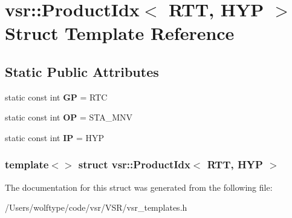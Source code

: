 \hypertarget{structvsr_1_1_product_idx_3_01_r_t_t_00_01_h_y_p_01_4}{\section{vsr\-:\-:Product\-Idx$<$ R\-T\-T, H\-Y\-P $>$ Struct Template Reference}
\label{structvsr_1_1_product_idx_3_01_r_t_t_00_01_h_y_p_01_4}
}
\subsection*{Static Public Attributes}
\begin{DoxyCompactItemize}
\item 
\hypertarget{structvsr_1_1_product_idx_3_01_r_t_t_00_01_h_y_p_01_4_aadbefc9de473b1d8f1e56f3e94e6aa9e}{static const int {\bfseries G\-P} = R\-T\-C}\label{structvsr_1_1_product_idx_3_01_r_t_t_00_01_h_y_p_01_4_aadbefc9de473b1d8f1e56f3e94e6aa9e}

\item 
\hypertarget{structvsr_1_1_product_idx_3_01_r_t_t_00_01_h_y_p_01_4_a3ebb3be1d540a99f85ecdbf57dceb4c9}{static const int {\bfseries O\-P} = S\-T\-A\-\_\-\-M\-N\-V}\label{structvsr_1_1_product_idx_3_01_r_t_t_00_01_h_y_p_01_4_a3ebb3be1d540a99f85ecdbf57dceb4c9}

\item 
\hypertarget{structvsr_1_1_product_idx_3_01_r_t_t_00_01_h_y_p_01_4_a487c5101efaa59ce7b1387dbc67d5a2d}{static const int {\bfseries I\-P} = H\-Y\-P}\label{structvsr_1_1_product_idx_3_01_r_t_t_00_01_h_y_p_01_4_a487c5101efaa59ce7b1387dbc67d5a2d}

\end{DoxyCompactItemize}
\subsubsection*{template$<$$>$ struct vsr\-::\-Product\-Idx$<$ R\-T\-T, H\-Y\-P $>$}



The documentation for this struct was generated from the following file\-:\begin{DoxyCompactItemize}
\item 
/\-Users/wolftype/code/vsr/\-V\-S\-R/vsr\-\_\-templates.\-h\end{DoxyCompactItemize}
